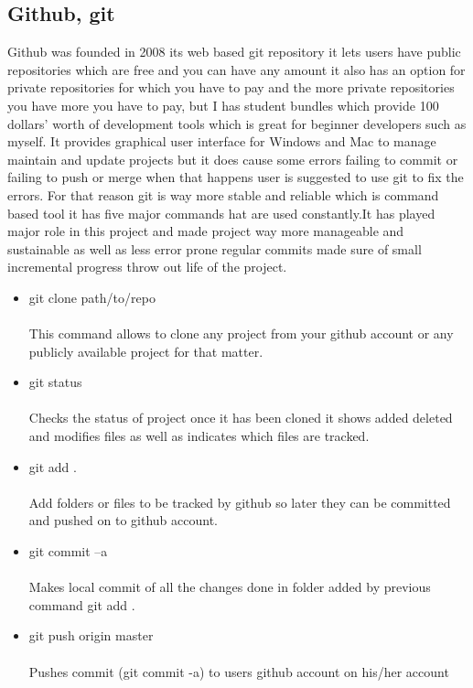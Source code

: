 \begin{itemize}
\subsection{Github, git}
\bigbreak
Github was founded in 2008 its web based git repository it lets users have public repositories which are free and you can have any amount it also has an option for private repositories for which you have to pay and the more private repositories you have more you have to pay, but I has student bundles which provide 100 dollars’ worth of development tools which is great for beginner developers such as myself. It provides graphical user interface for Windows and Mac to manage maintain and update projects but it does cause some errors failing to commit or failing to push or merge when that happens user is suggested to use git to fix the errors. For that reason git is way more stable and reliable which is command based tool it has five major commands hat are used constantly.It has played major role in this project and made project way more manageable and sustainable as well as less error prone regular commits made sure of small incremental progress throw out life of the project.

\begin{itemize}
	
\item git clone path/to/repo \\
\\This command allows to clone any project from your github account or any publicly available project for that matter.

\item git status \\
\\Checks the status of project once it has been cloned it shows added deleted and modifies files as well as indicates which files are tracked.

\item git add . \\ 
\\Add folders or files to be tracked by github so later they can be committed and pushed on to github account.

\item git commit –a \\
\\Makes local commit of all the changes done in folder added by previous command git add .

\item git push origin master \\ 
\\ Pushes commit (git commit -a) to users github account on his/her account


\end{itemize}
\end{itemize}
